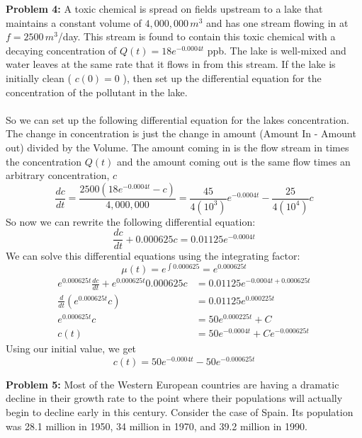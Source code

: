 \documentclass[12pt]{article}
\begin{document}
\newpage

\noindent \textbf{Problem 4: }A toxic chemical is spread on fields upstream to a lake that maintains a constant volume of $4,000,000\,m^3$ and has one stream flowing in at $f= 2500\,m^3$/day. This stream is found to contain this toxic chemical with a decaying concentration of $Q(t) = 18 e^{-0.0004 t}$ ppb. The lake is well-mixed and water leaves at the same rate that it flows in from this stream. If the lake is initially clean ( $c(0) = 0$ ), then set up the differential equation for the concentration of the pollutant in the lake.
\\ \\
So we can set up the following differential equation for the lakes concentration.  The change in concentration is just the change in amount (Amount In - Amount out) divided by the Volume.  The amount coming in is the flow stream in times the concentration $Q(t)$ and the amount coming out is the same flow times an arbitrary concentration, $c$
	\boldmath
	$$
	\frac{dc}{dt} = \frac{2500(18e^{-0.0004 t} - c)}{4,000,000} = \frac{45}{4(10^3)}e^{-0.0004 t} - \frac{25}{4(10^4)}c
	$$
	\unboldmath
So now we can rewrite the following differential equation:
	$$
	\frac{dc}{dt} + 0.000625c = 0.01125e^{-0.0004 t}
	$$
We can solve this differential equations using the integrating factor: 
	$$
	\mu(t) = e^{\int 0.000625} = e^{0.000625t}
	$$
	\begin{align*}
		e^{0.000625t}\frac{dc}{dt} + e^{0.000625t}0.000625c &= 0.01125e^{-0.0004t + 0.000625t} \\
		\frac{d}{dt}(e^{0.000625t}c) &= 0.01125e^{0.000225t} \\
		e^{0.000625t}c &= 50e^{0.000225t} + C \\
		c(t) &= 50e^{-0.0004t} + Ce^{-0.000625t}
	\end{align*}
Using our initial value, we get 
	\boldmath
		$$
		c(t) = 50e^{-0.0004t} - 50e^{-0.000625t}
		$$
	\unboldmath

\newpage

\noindent \textbf{Problem 5: }Most of the Western European countries are having a dramatic decline in their growth rate to the point where their populations will actually begin to decline early in this century. Consider the case of Spain. Its population was 28.1 million in 1950, 34 million in 1970, and 39.2 million in 1990.
\end{document}
